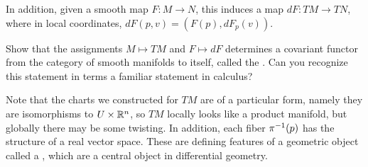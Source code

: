 %
In addition, given a smooth map $F : M \to N$, this induces a map
$dF : TM \to TN$, where in local coordinates, $dF(p,v) = (F(p), dF_p(v))$.
%
\begin{exer}
Show that the assignments $M \mapsto TM$ and $F \mapsto dF$ determines
a covariant functor from the category of smooth manifolds to itself,
called the . Can you recognize this statement in
terms a familiar statement in calculus?
\end{exer}
%
Note that the charts we constructed for $TM$ are of a particular form,
namely they are isomorphisms to $U \times \mathbb{R}^n$, so $TM$ locally looks
like a product manifold, but globally there may be some twisting. In
addition, each fiber $\pi^{-1}(p)$ has the structure of a real vector
space. These are defining features of a geometric object called a
, which are a central object in differential geometry.
